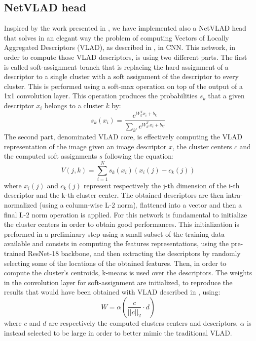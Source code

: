 \documentclass[10pt,twocolumn,letterpaper]{article}
\begin{document}
\subsection{NetVLAD head}\label{sec:NETVLAD}
Inspired by the work presented in \cite{NETVLAD}, we have implemented also a NetVLAD head that solves in an 
elegant way the problem of computing Vectors of Locally Aggregated Descriptors (VLAD), as described in \cite{VLAD},
in CNN. This network, in order to compute those VLAD descriptors, is using two different parts. 
The first is called soft-assignment branch that is replacing the hard assignment of a descriptor to a single cluster
with a soft assignment of the descriptor to every cluster. This is performed using a soft-max operation on top of the output of a 1x1
convolution layer. This operation produces the probabilities $s_k$ that a given descriptor $x_i$ belongs to a cluster $k$ by:
\begin{equation}
	s_k(x_i) = {\frac{e^{W_k^T x_i+b_k}}{\sum_{k'} e^{W_{k'}^T x_i+b_{k'}}}}
\end{equation} 
The second part, denominated VLAD core, is effectively computing the 
VLAD representation of the image given an image descriptor $x$, the cluster centers $c$ and the computed soft assignments
$s$ following the equation:
\begin{equation}
	V(j,k) = \sum_{i=1}^N s_k(x_i) (x_i(j) - c_k(j))
\end{equation} 
where $x_i(j)$ and $c_k(j)$ represent respectively the j-th dimension of the i-th descriptor and the k-th cluster center.
The obtained descriptors are then intra-normalized (using a column-wise L-2 norm), flattened into a vector and then a
final L-2 norm operation is applied.
For this network is fundamental to initialize the cluster centers in order to obtain good performances. This initialization
is preformed in a preliminary step using a small subset of the training data available and consists in computing the features 
representations, using the pre-trained ResNet-18 backbone, and then extracting the descriptors by randomly selecting some of the locations of
the obtained features. Then, in order to compute the cluster's centroids, k-means is used over the descriptors. The 
weights in the convolution layer for soft-assignment are initialized, to reproduce the results that would have been obtained
with VLAD described in \cite{VLAD}, using:
\begin{equation}
   W = \alpha ({\frac{c}{{||c||}_2}} \cdot d )
\end{equation}
where $c$ and $d$ are respectively the computed clusters centers and descriptors, $\alpha$ is instead selected to be large
in order to better mimic the traditional VLAD.
\end{document}
